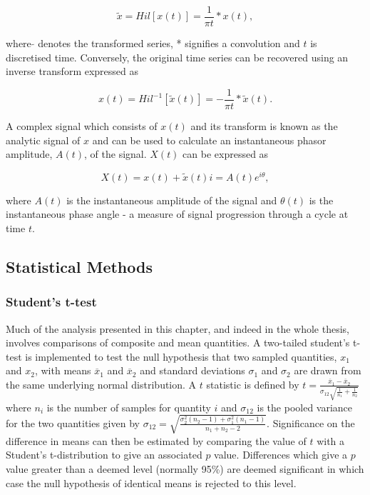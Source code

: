 \begin{equation} \label{theoretical_fourier}
\tilde{x} = Hil[x(t)] = \frac{1}{\pi t} * x(t),
\end{equation}

where $\tilde{}$ denotes the transformed series, * signifies a convolution and $t$ is discretised time. Conversely, the original time series can be recovered using an inverse transform expressed as

\begin{equation} \label{theoretical_fourier}
{x(t)} = Hil^{-1}[\tilde{x}(t)] = -\frac{1}{\pi t} * \tilde{x}(t).
\end{equation}

A complex signal which consists of $x(t)$ and its transform is known as the analytic signal of $x$ and can be used to calculate an instantaneous phasor amplitude, $A(t)$, of the signal. $X(t)$ can be expressed as

\begin{equation} \label{theoretical_fourier}
X(t) = x(t) + \tilde{x}(t) i = A(t) e^{i\theta},
\end{equation}

where $A(t)$ is the instantaneous amplitude of the signal and $\theta(t)$ is the instantaneous phase angle - a measure of signal progression through a cycle at time $t$.

\subsection{Statistical Methods}
\label{sec:stat_tests}

\subsubsection*{Student's t-test}
Much of the analysis presented in this chapter, and indeed in the whole thesis, involves comparisons of composite and mean quantities. A two-tailed student's t-test is implemented to test the null hypothesis that two sampled quantities, $x_1$ and $x_2$, with means $\overline{x}_1$ and $\overline{x}_2$ and standard deviations $\sigma_{1}$ and $\sigma_{2}$ are drawn from the same underlying normal distribution. A $t$ statistic is defined by $t = \frac{\overline{x}_1 - \overline{x}_2}{\sigma_{12} \sqrt{\frac{1}{n_1} + \frac{1}{n_2}}}$ where $n_i$ is the number of samples for quantity $i$ and $\sigma_{12}$ is the pooled variance for the two quantities given by $\sigma_{12} = \sqrt{\frac{\sigma^2_2 (n_2-1) + \sigma^2_1(n_1 - 1)}{n_1+n_2-2}}$. Significance on the difference in means can then be estimated by comparing the value of $t$ with a Student's t-distribution to give an associated $p$ value. Differences which give a $p$ value greater than a deemed level (normally 95\%) are deemed significant in which case the null hypothesis of identical means is rejected to this level.

